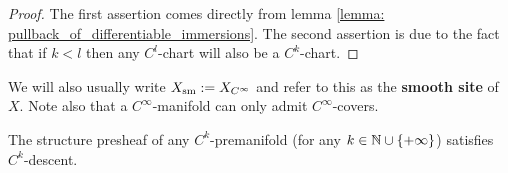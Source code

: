             \begin{proof}
                The first assertion comes directly from lemma \ref{lemma: pullback_of_differentiable_immersions}. The second assertion is due to the fact that if $k < l$ then any $C^l$-chart will also be a $C^k$-chart.
            \end{proof}
        We will also usually write $X_{\mathrm{sm}} := X_{C^{\infty}}$ and refer to this as the \textbf{smooth site} of $X$. Note also that a $C^{\infty}$-manifold can only admit $C^{\infty}$-covers.
        \begin{proposition} \label{prop: premanifolds_are_ringed_spaces}
            The structure presheaf of any $C^k$-premanifold (for any $k \in \mathbb{N} \cup \{+\infty\}$) satisfies $C^k$-descent.
        \end{proposition}
